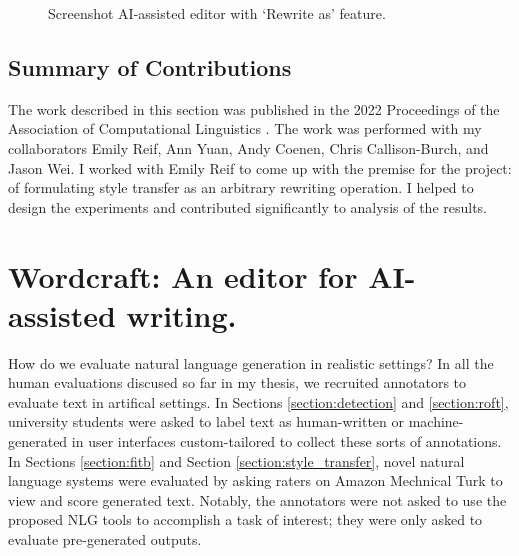 \begin{figure}[!htb]
  \centering
  \caption{Screenshot AI-assisted editor with `Rewrite as' feature.\label{fig:wc}}
  \vspace{-0.1cm}
\end{figure} 

\subsection{Summary of Contributions}
The work described in this section was published in the 2022 Proceedings of the Association of Computational Linguistics \citep{reif2021recipe}.
The work was performed with my collaborators Emily Reif, Ann Yuan, Andy Coenen, Chris Callison-Burch, and Jason Wei.
I worked with Emily Reif to come up with the premise for the project: of formulating style transfer as an arbitrary rewriting operation.
I helped to design the experiments and contributed significantly to analysis of the results.


\section{Wordcraft: An editor for AI-assisted writing.}
\label{section:wordcraft}

How do we evaluate natural language generation in realistic settings? In all the human evaluations discused so far in my thesis, we recruited annotators to evaluate text in artifical settings. In Sections \ref{section:detection} and \ref{section:roft}, university students were asked to label text as human-written or machine-generated in user interfaces custom-tailored to collect these sorts of annotations. In Sections \ref{section:fitb} and Section \ref{section:style_transfer}, novel natural language systems were evaluated by asking raters on Amazon Mechnical Turk to view and score generated text.
Notably, the annotators were not asked to use the proposed NLG tools to accomplish a task of interest; they were only asked to evaluate pre-generated outputs.

